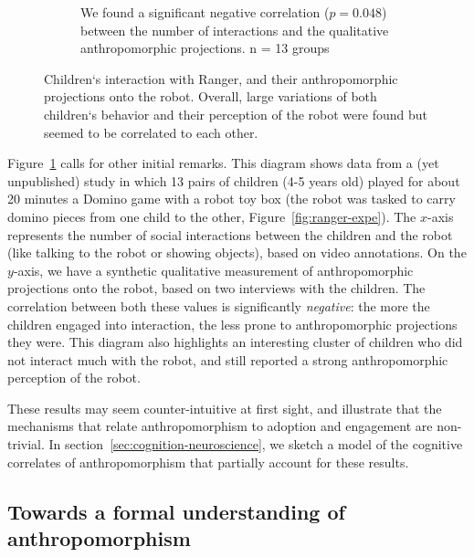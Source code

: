 \documentclass{frontiersSCNS} %
\begin{document}
\begin{figure}[h!]
\begin{subfigure}[b]{0.48\columnwidth}
            \caption{We found a significant negative correlation ($p=0.048$) between the
    number of interactions and the qualitative anthropomorphic projections. n = 13 groups}
            \label{fig:qualitative-score}
        \end{subfigure}
        \caption{Children`s interaction with Ranger, and their anthropomorphic projections onto the robot. Overall, large variations of both children`s behavior and their perception of the robot were found but seemed to be correlated to each other.}
    \label{fig:ranger}
\end{figure}


Figure~\ref{fig:qualitative-score} calls for other initial remarks. This diagram
shows data from a (yet unpublished) study in which 13 pairs of children (4-5 years old)
played for about 20 minutes a Domino game with a robot toy box (the robot was tasked to
carry domino pieces from one child to the other, Figure~\ref{fig:ranger-expe}).
The $x$-axis represents the number of social interactions between the children
and the robot (like talking to the robot or showing objects), based on video annotations. On
the $y$-axis, we have a synthetic qualitative measurement of anthropomorphic
projections onto the robot, based on two interviews with the children. The correlation between both these
values is significantly \emph{negative}: the more the children engaged into
interaction, the less prone to anthropomorphic projections they were. This
diagram also highlights an interesting cluster of children who did not interact
much with the robot, and still reported a strong anthropomorphic perception of
the robot.

These results may seem counter-intuitive at first sight, and illustrate that the
mechanisms that relate anthropomorphism to adoption and engagement are
non-trivial. In section~\ref{sec:cognition-neuroscience}, we sketch a model of
the cognitive correlates of anthropomorphism that partially account for these
results.


\subsection{Towards a formal understanding of anthropomorphism}
\end{document}
